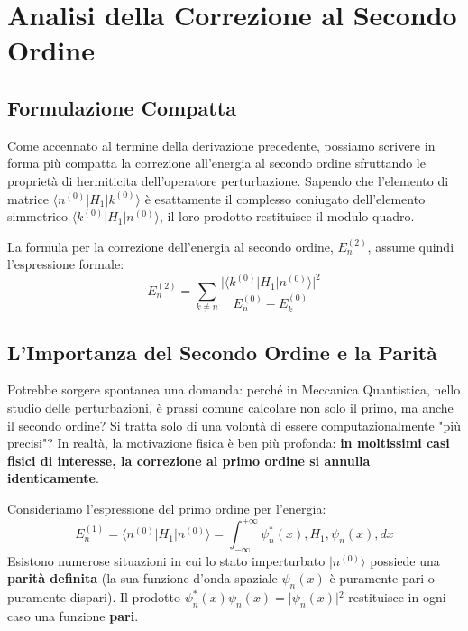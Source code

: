 \section{Analisi della Correzione al Secondo Ordine}

\subsection{Formulazione Compatta}
Come accennato al termine della derivazione precedente, possiamo scrivere in forma più compatta la correzione all'energia al secondo ordine sfruttando le proprietà di hermiticita dell'operatore perturbazione. Sapendo che l'elemento di matrice $\langle n^{(0)} \vert{} H_1 \vert{} k^{(0)} \rangle$ è esattamente il complesso coniugato dell'elemento simmetrico $\langle k^{(0)} \vert{} H_1 \vert{} n^{(0)} \rangle$, il loro prodotto restituisce il modulo quadro.

La formula per la correzione dell'energia al secondo ordine, $E_n^{(2)}$, assume quindi l'espressione formale:
\begin{equation}
E_n^{(2)} = \sum_{k \neq n} \frac{\big| \langle k^{(0)} | H_1 | n^{(0)} \rangle \big|^2}{E_n^{(0)} - E_k^{(0)}}
\end{equation}

\subsection{L'Importanza del Secondo Ordine e la Parità}
Potrebbe sorgere spontanea una domanda: perché in Meccanica Quantistica, nello studio delle perturbazioni, è prassi comune calcolare non solo il primo, ma anche il secondo ordine? Si tratta solo di una volontà di essere computazionalmente "più precisi"? In realtà, la motivazione fisica è ben più profonda: \textbf{in moltissimi casi fisici di interesse, la correzione al primo ordine si annulla identicamente}.

Consideriamo l'espressione del primo ordine per l'energia:
\begin{equation}
E_n^{(1)} = \langle n^{(0)} | H_1 | n^{(0)} \rangle = \int_{-\infty}^{+\infty} \psi_n^*(x) , H_1 , \psi_n(x) , dx
\end{equation}
Esistono numerose situazioni in cui lo stato imperturbato $\vert{}n^{(0)}\rangle$ possiede una \textbf{parità definita} (la sua funzione d'onda spaziale $\psi_n(x)$ è puramente pari o puramente dispari). Il prodotto $\psi_n^*(x) \psi_n(x) = \vert{}\psi_n(x)\vert{}^2$ restituisce in ogni caso una funzione \textbf{pari}.

